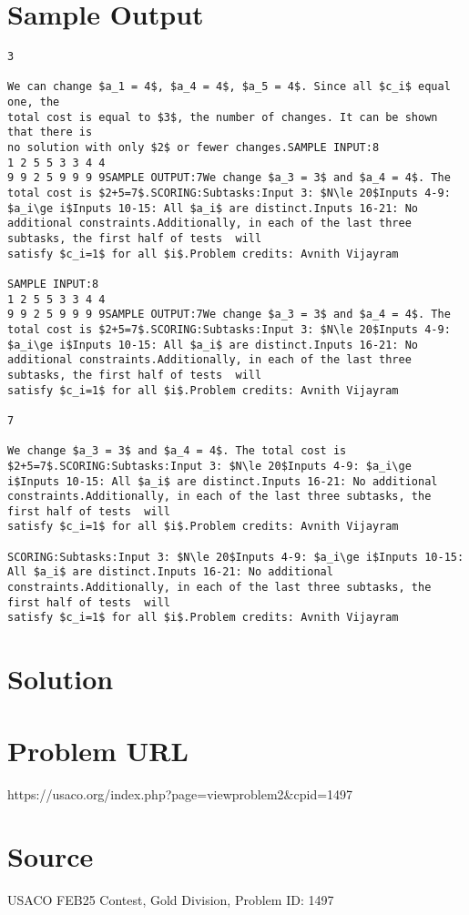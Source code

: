 \documentclass[12pt]{article}
\begin{document}
\section*{Sample Output}
\begin{verbatim}
3

We can change $a_1 = 4$, $a_4 = 4$, $a_5 = 4$. Since all $c_i$ equal one, the
total cost is equal to $3$, the number of changes. It can be shown that there is
no solution with only $2$ or fewer changes.SAMPLE INPUT:8
1 2 5 5 3 3 4 4
9 9 2 5 9 9 9 9SAMPLE OUTPUT:7We change $a_3 = 3$ and $a_4 = 4$. The total cost is $2+5=7$.SCORING:Subtasks:Input 3: $N\le 20$Inputs 4-9: $a_i\ge i$Inputs 10-15: All $a_i$ are distinct.Inputs 16-21: No additional constraints.Additionally, in each of the last three subtasks, the first half of tests  will
satisfy $c_i=1$ for all $i$.Problem credits: Avnith Vijayram

SAMPLE INPUT:8
1 2 5 5 3 3 4 4
9 9 2 5 9 9 9 9SAMPLE OUTPUT:7We change $a_3 = 3$ and $a_4 = 4$. The total cost is $2+5=7$.SCORING:Subtasks:Input 3: $N\le 20$Inputs 4-9: $a_i\ge i$Inputs 10-15: All $a_i$ are distinct.Inputs 16-21: No additional constraints.Additionally, in each of the last three subtasks, the first half of tests  will
satisfy $c_i=1$ for all $i$.Problem credits: Avnith Vijayram

7

We change $a_3 = 3$ and $a_4 = 4$. The total cost is $2+5=7$.SCORING:Subtasks:Input 3: $N\le 20$Inputs 4-9: $a_i\ge i$Inputs 10-15: All $a_i$ are distinct.Inputs 16-21: No additional constraints.Additionally, in each of the last three subtasks, the first half of tests  will
satisfy $c_i=1$ for all $i$.Problem credits: Avnith Vijayram

SCORING:Subtasks:Input 3: $N\le 20$Inputs 4-9: $a_i\ge i$Inputs 10-15: All $a_i$ are distinct.Inputs 16-21: No additional constraints.Additionally, in each of the last three subtasks, the first half of tests  will
satisfy $c_i=1$ for all $i$.Problem credits: Avnith Vijayram
\end{verbatim}

\section*{Solution}


\section*{Problem URL}
https://usaco.org/index.php?page=viewproblem2&cpid=1497

\section*{Source}
USACO FEB25 Contest, Gold Division, Problem ID: 1497
\end{document}
